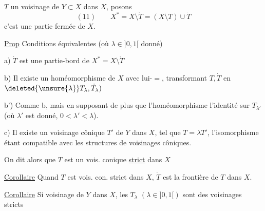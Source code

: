  $T$ un voisinage
 de $Y\subset X$
dans $X$, posons
\[
(11)\qquad X^*=X\setminus\mathring T=(X\setminus T)\cup\dot T
\]
c'est une partie fermée de $X$. 

\uline{Prop} Conditions équivalentes (où $\lambda\in]0,1[$ donné)

a) $\dot T$ est une partie-bord de $X^*=X\setminus\mathring T$

b) Il existe un homéomorphisme de $X$
avec lui-$=$, transformant $T,\dot T$ en
$\deleted{\unsure{\lambda}}T_\lambda,\dot T_\lambda)$

b') Comme b, mais en supposant de plus
que l'homéomorphisme  l'identité
sur $T_{\lambda'}$ (où 
$\lambda'$ est donné, $0<\lambda'<\lambda$).

c) Il existe un voisinage  cônique $T'$
de $Y$ dans $X$,  tel que $T=\lambda T'$,
l'isomorphisme étant compatible avec les
structures de voisinages côniques.

On dit alors que $T$ est un vois.  conique
\uline{strict} dans $X$


\uline{Corollaire} Quand $T$ est vois.  con. strict dans $X$,
$\dot T$ est la frontière de $T$ dans $X$.

\uline{Corollaire} Si 
 voisinage
 de $Y$
dans $X$, les $T_\lambda$ $(\lambda\in]0,1[)$ sont des voisinages
 stricts

